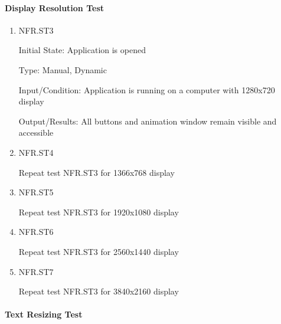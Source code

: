 \documentclass[12pt, titlepage]{article}
\begin{document}
\paragraph{Display Resolution Test}

\begin{enumerate}

\item{NFR.ST3\\}

Initial State: Application is opened

Type: Manual, Dynamic

Input/Condition: Application is running on a computer with 1280x720 display

Output/Results: All buttons and animation window remain visible and accessible

\item{NFR.ST4\\}

Repeat test NFR.ST3 for 1366x768 display

\item{NFR.ST5\\}

Repeat test NFR.ST3 for 1920x1080 display

\item{NFR.ST6\\}

Repeat test NFR.ST3 for 2560x1440 display

\item{NFR.ST7\\}

Repeat test NFR.ST3 for 3840x2160 display

\end{enumerate}

\paragraph{Text Resizing Test}
\end{document}
